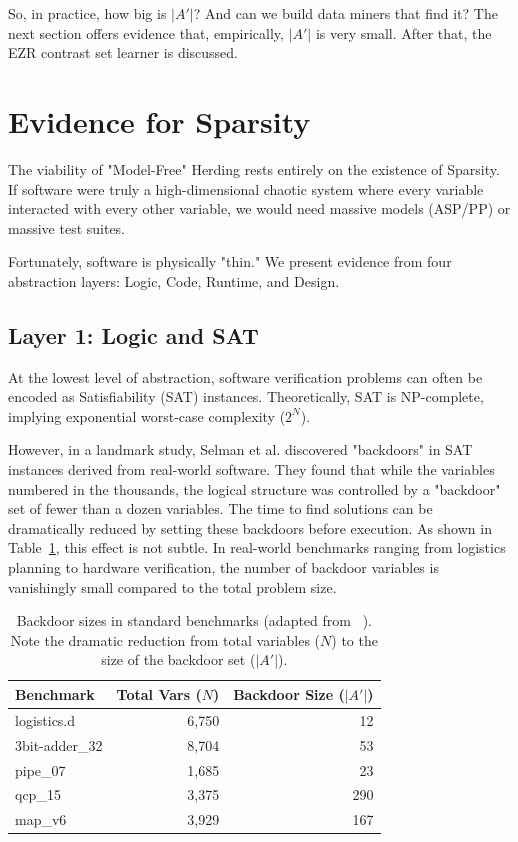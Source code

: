 \documentclass[pdflatex,sn-basic]{sn-jnl}
\begin{document}
So,  in practice, how big is $|A'|$?
And can we build data miners that find it?
The next section offers evidence that, empirically,  $|A'|$ is very small.
After that, the EZR contrast set learner is discussed.



\section{Evidence for Sparsity}
The viability of "Model-Free" Herding rests entirely on the existence of 
Sparsity. If software were truly a high-dimensional chaotic system where 
every variable interacted with every other variable, we would need massive 
models (ASP/PP) or massive test suites.

Fortunately, software is physically "thin." We present evidence from four 
abstraction layers: Logic, Code, Runtime, and Design.

\subsection{Layer 1: Logic and SAT}
At the lowest level of abstraction, software verification problems can often be
encoded as Satisfiability (SAT) instances. Theoretically, SAT is NP-complete, 
implying exponential worst-case complexity ($2^N$).

 However, in a landmark study, Selman et al. \citep{Selman03} discovered 
"backdoors" in SAT instances derived from real-world software. They found 
that while the variables numbered in the thousands, the logical structure was 
controlled by a "backdoor" set of fewer than a dozen variables.  The time to find
solutions can be dramatically reduced by
setting these backdoors before execution.
As shown in Table~\ref{tab:selman}, this effect is not subtle. In
real-world benchmarks ranging from logistics planning to hardware
verification, the number of backdoor variables is vanishingly small
compared to the total problem size.
\begin{table}[!h]
\centering
\footnotesize
\caption{Backdoor sizes in standard benchmarks (adapted from
~\citep{Selman03}). Note the dramatic reduction from total variables
($N$) to the size of the backdoor set ($|A'|$).}
\label{tab:selman}
\begin{tabular}{l|r|r}
\textbf{Benchmark} & \textbf{Total Vars ($N$)} & \textbf{Backdoor Size
($|A'|$)} \\
\midrule
logistics.d     & 6,750  & 12 \\
3bit-adder\_32  & 8,704  & 53 \\
pipe\_07        & 1,685  & 23 \\
qcp\_15         & 3,375  & 290 \\
map\_v6         & 3,929  & 167
\end{tabular}
\end{table}
\end{document}
